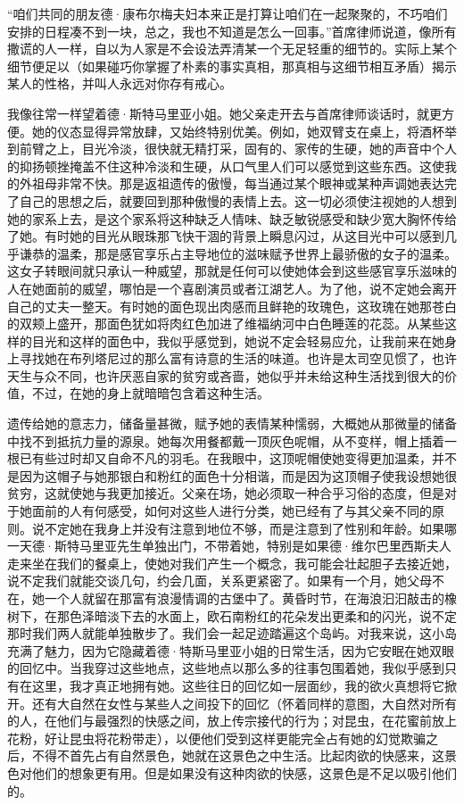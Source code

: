 \par “咱们共同的朋友德·康布尔梅夫妇本来正是打算让咱们在一起聚聚的，不巧咱们安排的日程凑不到一块，总之，我也不知道是怎么一回事。”首席律师说道，像所有撒谎的人一样，自以为人家是不会设法弄清某一个无足轻重的细节的。实际上某个细节便足以（如果碰巧你掌握了朴素的事实真相，那真相与这细节相互矛盾）揭示某人的性格，并叫人永远对你存有戒心。
\par 我像往常一样望着德·斯特马里亚小姐。她父亲走开去与首席律师谈话时，就更方便。她的仪态显得异常放肆，又始终特别优美。例如，她双臂支在桌上，将酒杯举到前臂之上，目光冷淡，很快就无精打采，固有的、家传的生硬，她的声音中个人的抑扬顿挫掩盖不住这种冷淡和生硬，从口气里人们可以感觉到这些东西。这使我的外祖母非常不快。那是返祖遗传的傲慢，每当通过某个眼神或某种声调她表达完了自己的思想之后，就要回到那种傲慢的表情上去。这一切必须使注视她的人想到她的家系上去，是这个家系将这种缺乏人情味、缺乏敏锐感受和缺少宽大胸怀传给了她。有时她的目光从眼珠那飞快干涸的背景上瞬息闪过，从这目光中可以感到几乎谦恭的温柔，那是感官享乐占主导地位的滋味赋予世界上最骄傲的女子的温柔。这女子转眼间就只承认一种威望，那就是任何可以使她体会到这些感官享乐滋味的人在她面前的威望，哪怕是一个喜剧演员或者江湖艺人。为了他，说不定她会离开自己的丈夫一整天。有时她的面色现出肉感而且鲜艳的玫瑰色，这玫瑰在她那苍白的双颊上盛开，那面色犹如将肉红色加进了维福纳河中白色睡莲的花蕊。从某些这样的目光和这样的面色中，我似乎感觉到，她说不定会轻易应允，让我前来在她身上寻找她在布列塔尼过的那么富有诗意的生活的味道。也许是太司空见惯了，也许天生与众不同，也许厌恶自家的贫穷或吝啬，她似乎并未给这种生活找到很大的价值，不过，在她的身上就暗暗包含着这种生活。
\par 遗传给她的意志力，储备量甚微，赋予她的表情某种懦弱，大概她从那微量的储备中找不到抵抗力量的源泉。她每次用餐都戴一顶灰色呢帽，从不变样，帽上插着一根已有些过时却又自命不凡的羽毛。在我眼中，这顶呢帽使她变得更加温柔，并不是因为这帽子与她那银白和粉红的面色十分相谐，而是因为这顶帽子使我设想她很贫穷，这就使她与我更加接近。父亲在场，她必须取一种合乎习俗的态度，但是对于她面前的人有何感受，如何对这些人进行分类，她已经有了与其父亲不同的原则。说不定她在我身上并没有注意到地位不够，而是注意到了性别和年龄。如果哪一天德·斯特马里亚先生单独出门，不带着她，特别是如果德·维尔巴里西斯夫人走来坐在我们的餐桌上，使她对我们产生一个概念，我可能会壮起胆子去接近她，说不定我们就能交谈几句，约会几面，关系更紧密了。如果有一个月，她父母不在，她一个人就留在那富有浪漫情调的古堡中了。黄昏时节，在海浪汩汩敲击的橡树下，在那色泽暗淡下去的水面上，欧石南粉红的花朵发出更柔和的闪光，说不定那时我们两人就能单独散步了。我们会一起足迹踏遍这个岛屿。对我来说，这小岛充满了魅力，因为它隐藏着德·特斯马里亚小姐的日常生活，因为它安眠在她双眼的回忆中。当我穿过这些地点，这些地点以那么多的往事包围着她，我似乎感到只有在这里，我才真正地拥有她。这些往日的回忆如一层面纱，我的欲火真想将它掀开。还有大自然在女性与某些人之间投下的回忆（怀着同样的意图，大自然对所有的人，在他们与最强烈的快感之间，放上传宗接代的行为；对昆虫，在花蜜前放上花粉，好让昆虫将花粉带走），以便他们受到这样更能完全占有她的幻觉欺骗之后，不得不首先占有自然景色，她就在这景色之中生活。比起肉欲的快感来，这景色对他们的想象更有用。但是如果没有这种肉欲的快感，这景色是不足以吸引他们的。
